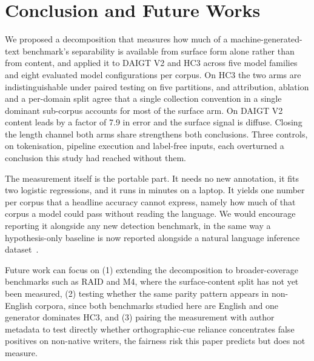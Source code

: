 \section{Conclusion and Future Works}
\label{sec:conclusion}

We proposed a decomposition that measures how much of a machine-generated-text benchmark's separability is available from surface form alone rather than from content, and applied it to DAIGT V2 and HC3 across five model families and eight evaluated model configurations per corpus. On HC3 the two arms are indistinguishable under paired testing on five partitions, and attribution, ablation and a per-domain split agree that a single collection convention in a single dominant sub-corpus accounts for most of the surface arm. On DAIGT V2 content leads by a factor of 7.9 in error and the surface signal is diffuse. Closing the length channel both arms share strengthens both conclusions. Three controls, on tokenisation, pipeline execution and label-free inputs, each overturned a conclusion this study had reached without them.

The measurement itself is the portable part. It needs no new annotation, it fits two logistic regressions, and it runs in minutes on a laptop. It yields one number per corpus that a headline accuracy cannot express, namely how much of that corpus a model could pass without reading the language. We would encourage reporting it alongside any new detection benchmark, in the same way a hypothesis-only baseline is now reported alongside a natural language inference dataset~\cite{Poliak2018hypothesis}.

Future work can focus on (1) extending the decomposition to broader-coverage benchmarks such as RAID and M4, where the surface-content split has not yet been measured, (2) testing whether the same parity pattern appears in non-English corpora, since both benchmarks studied here are English and one generator dominates HC3, and (3) pairing the measurement with author metadata to test directly whether orthographic-cue reliance concentrates false positives on non-native writers, the fairness risk this paper predicts but does not measure.
